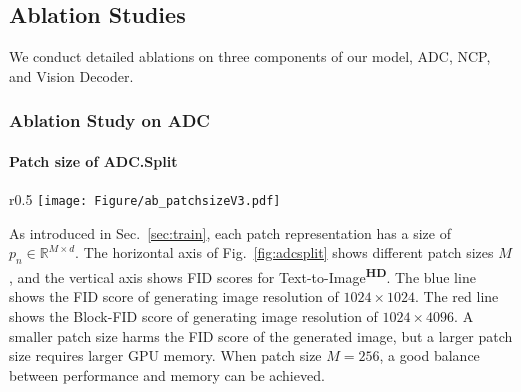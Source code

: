\documentclass{article}
\begin{document}
\subsection{Ablation Studies}
\vspace{-2mm}
We conduct detailed ablations on three components of our model, ADC, NCP, and Vision Decoder. 

\subsubsection{Ablation Study on ADC}
\vspace{-2mm}
\paragraph{Patch size of ADC.Split}
\begin{wrapfigure}[11]{r}{0.5\textwidth}
\vspace{-0.17in}
    \centering
    \texttt{[image: Figure/ab\_patchsizeV3.pdf]}
    \vspace{-1.5em}
    \caption{Impact of patch size.}
    \label{fig:adcsplit}
\end{wrapfigure}
As introduced in Sec.~\ref{sec:train}, each patch representation has a size of $p_n\in \mathbb{R}^{M\times d}$. The horizontal axis of Fig.~\ref{fig:adcsplit} shows different patch sizes $M$, and the vertical axis shows FID scores for Text-to-Image\textsuperscript{\textbf{HD}}. The blue line shows the FID score of generating image resolution of $1024\times 1024$. The red line shows the Block-FID score of generating image resolution of $1024\times 4096$. A smaller patch size harms the FID score of the generated image, but a larger patch size requires larger GPU memory. When patch size $M=256$, a good balance between performance and memory can be achieved.
\end{document}
